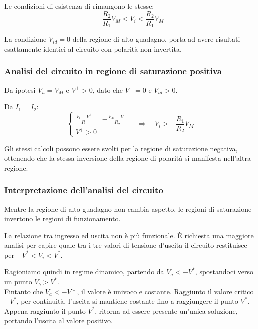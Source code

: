 \documentclass[../template]{subfiles}
\begin{document}
Le condizioni di esistenza di rimangono le stesse:
\[
    -\frac{R_2}{R_1} V_M < V_i < \frac{R_2}{R_1} V_M
\]
\begin{tcolorbox}
La condizione $V_{id} = 0$ della regione di alto guadagno, porta ad avere risultati esattamente identici
al circuito con polarità non invertita.
\end{tcolorbox}

\subsubsection{Analisi del circuito in regione di saturazione positiva}
Da ipotesi $V_u = V_M$ e $V^+ > 0$, dato che $V^- = 0$ e $V_{id} > 0$.

Da $I_1 = I_2$:
\[
    \begin{cases}
        \frac{V_i - V^+}{R_1} = -\frac{V_M - V^+}{R_2}
        \\
        V^+ > 0
    \end{cases}
    \quad\Rightarrow\quad
    V_i > -\frac{R_1}{R_2} V_M
\]

Gli stessi calcoli possono essere svolti per la regione di saturazione negativa, ottenendo che la stessa inversione
della regione di polarità si manifesta nell'altra regione.

\subsubsection{Interpretazione dell'analisi del circuito}
Mentre la regione di alto guadagno non cambia aspetto, le regioni di saturazione invertono le regioni di funzionamento.

\begin{center}
\end{center}

La relazione tra ingresso ed uscita non è più funzionale. È richiesta una maggiore analisi per capire quale tra i tre valori
di tensione d'uscita il circuito restituisce per $-V^* < V_i < V^*$.

Ragioniamo quindi in regime dinamico, partendo da $V_a < -V^*$, spostandoci verso un punto $V_b > V^*$.
\\
Fintanto che $V_a < -V*$, il valore è univoco e costante. Raggiunto il valore critico $-V^*$, per continuità,
l'uscita si mantiene costante fino a raggiungere il punto $V^*$.
Appena raggiunto il punto $V^*$, ritorna ad essere presente un'unica soluzione, portando l'uscita al valore positivo.
\end{document}
